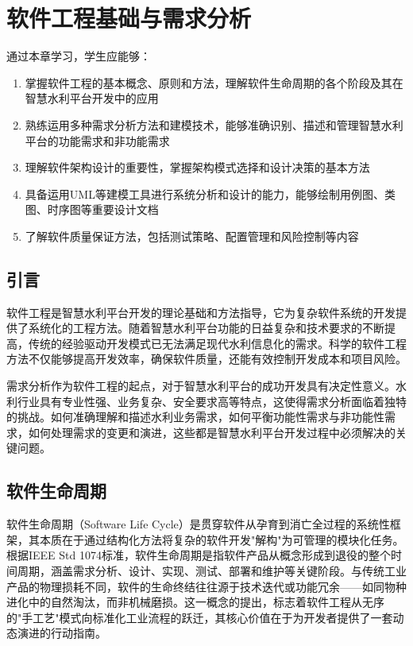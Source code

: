 \chapter{软件工程基础与需求分析}

\begin{learningobjectives}
通过本章学习，学生应能够：
\begin{enumerate}
    \item 掌握软件工程的基本概念、原则和方法，理解软件生命周期的各个阶段及其在智慧水利平台开发中的应用
    \item 熟练运用多种需求分析方法和建模技术，能够准确识别、描述和管理智慧水利平台的功能需求和非功能需求
    \item 理解软件架构设计的重要性，掌握架构模式选择和设计决策的基本方法
    \item 具备运用UML等建模工具进行系统分析和设计的能力，能够绘制用例图、类图、时序图等重要设计文档
    \item 了解软件质量保证方法，包括测试策略、配置管理和风险控制等内容
\end{enumerate}
\end{learningobjectives}

\section{引言}

软件工程是智慧水利平台开发的理论基础和方法指导，它为复杂软件系统的开发提供了系统化的工程方法。随着智慧水利平台功能的日益复杂和技术要求的不断提高，传统的经验驱动开发模式已无法满足现代水利信息化的需求。科学的软件工程方法不仅能够提高开发效率，确保软件质量，还能有效控制开发成本和项目风险。

需求分析作为软件工程的起点，对于智慧水利平台的成功开发具有决定性意义。水利行业具有专业性强、业务复杂、安全要求高等特点，这使得需求分析面临着独特的挑战。如何准确理解和描述水利业务需求，如何平衡功能性需求与非功能性需求，如何处理需求的变更和演进，这些都是智慧水利平台开发过程中必须解决的关键问题。

\section{软件生命周期}

软件生命周期（Software Life Cycle）是贯穿软件从孕育到消亡全过程的系统性框架，其本质在于通过结构化方法将复杂的软件开发"解构"为可管理的模块化任务。根据IEEE Std 1074标准，软件生命周期是指软件产品从概念形成到退役的整个时间周期，涵盖需求分析、设计、实现、测试、部署和维护等关键阶段。与传统工业产品的物理损耗不同，软件的生命终结往往源于技术迭代或功能冗余——如同物种进化中的自然淘汰，而非机械磨损。这一概念的提出，标志着软件工程从无序的"手工艺"模式向标准化工业流程的跃迁，其核心价值在于为开发者提供了一套动态演进的行动指南。

